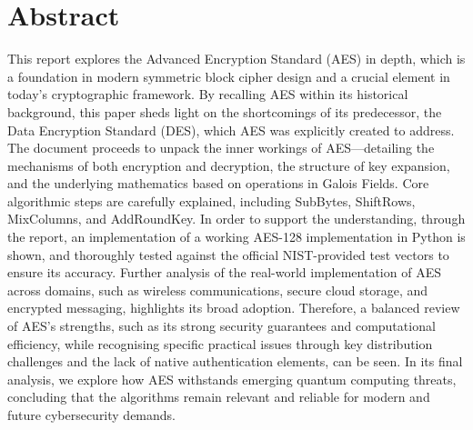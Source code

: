 \section*{Abstract} %

This report explores the Advanced Encryption Standard (AES) in depth, 
which is a foundation in modern symmetric block cipher design and a crucial element in today's cryptographic framework. By recalling AES within its historical background, this paper sheds light on the shortcomings of its predecessor, the Data Encryption Standard (DES), which AES was explicitly created to address. 
The document proceeds to unpack the inner workings of AES—detailing the mechanisms of both encryption and decryption, 
the structure of key expansion, 
and the underlying mathematics based on operations in Galois Fields. 
Core algorithmic steps are carefully explained, 
including SubBytes, ShiftRows, MixColumns, and AddRoundKey. 
In order to support the understanding, through the report, an implementation of a working AES-128 implementation in Python is shown, 
and thoroughly tested against the official NIST-provided test vectors to ensure its accuracy.
Further analysis of the real-world implementation of AES across domains, such as wireless communications, secure cloud storage, and encrypted messaging, highlights its broad adoption. 
Therefore, a balanced review of AES's strengths, 
such as its strong security guarantees and computational efficiency, 
while recognising specific practical issues through key distribution challenges and the lack of native authentication elements, can be seen. 
In its final analysis, we explore how AES withstands emerging quantum computing threats, 
concluding that the algorithms remain relevant and reliable for modern and future cybersecurity demands.